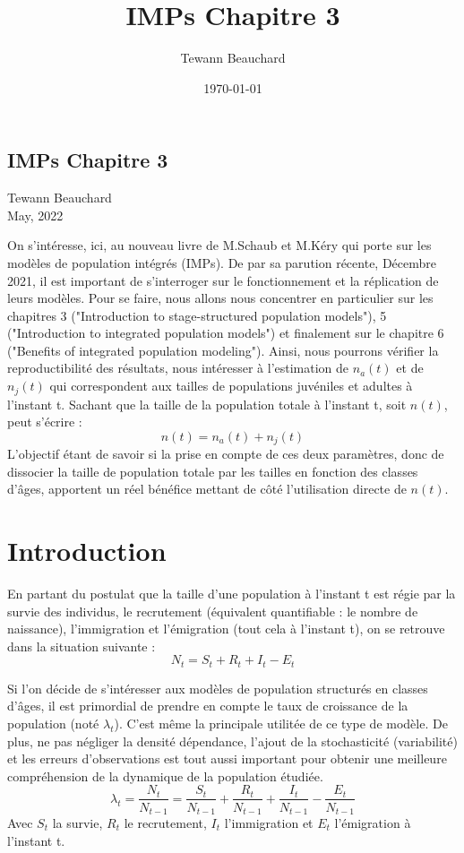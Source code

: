 \documentclass[12pt,a4paper]{article}
\title{IMPs Chapitre 3}
\date{\today}
\author{Tewann Beauchard}
\begin{document}
\begin{center}
\section*{IMPs Chapitre 3}
\vspace*{1cm}
Tewann Beauchard \\
\vspace*{1cm}
May, 2022
\end{center}
\vspace*{1cm}

On s'intéresse, ici, au nouveau livre de M.Schaub et M.Kéry qui porte sur les modèles de population intégrés (IMPs). De par sa parution récente, Décembre 2021, il est important de s'interroger sur le fonctionnement et la réplication de leurs modèles. Pour se faire, nous allons nous concentrer en particulier sur les chapitres 3 ("Introduction to stage-structured population models"), 5 ("Introduction to integrated population models") et finalement sur le chapitre 6 ("Benefits of integrated population modeling"). Ainsi, nous pourrons vérifier la reproductibilité des résultats, nous intéresser à l'estimation de $n_{a}(t)$ et de $n_{j}(t)$ qui correspondent aux tailles de populations juvéniles et adultes à l'instant t. Sachant que la taille de la population totale à l'instant t, soit $n(t)$, peut s'écrire : $$n(t)= n_{a}(t) + n_{j}(t)$$L'objectif étant de savoir si la prise en compte de ces deux paramètres, donc de dissocier la taille de population totale par les tailles en fonction des classes d'âges, apportent un réel bénéfice mettant de côté l'utilisation directe de $n(t)$.

\section{Introduction}
En partant du postulat que la taille d'une population à l'instant t est régie par la survie des individus, le recrutement (équivalent quantifiable : le nombre de naissance), l'immigration et l'émigration (tout cela à l'instant t), on se retrouve dans la situation suivante : 
\begin{equation}
N_{t}=S_{t}+R_{t}+I_{t}-E_{t}
\end{equation}

Si l'on décide de s'intéresser aux modèles de population structurés en classes d'âges, il est primordial de prendre en compte le taux de croissance de la population (noté $\lambda_{t}$). C'est même la principale utilitée de ce type de modèle. De plus, ne pas négliger la densité dépendance, l'ajout de la stochasticité (variabilité) et les erreurs d'observations est tout aussi important pour obtenir une meilleure compréhension de la dynamique de la population étudiée.
\begin{equation}
\lambda_{t}=\dfrac{N_{t}}{N_{t-1}}=\dfrac{S_{t}}{N_{t-1}}+\dfrac{R_{t}}{N_{t-1}}+\dfrac{I_{t}}{N_{t-1}}-\dfrac{E_{t}}{N_{t-1}}
\end{equation}
Avec $S_{t}$ la survie, $R_{t}$ le recrutement, $I_{t}$ l'immigration et $E_{t}$ l'émigration à l'instant t.
\end{document}
